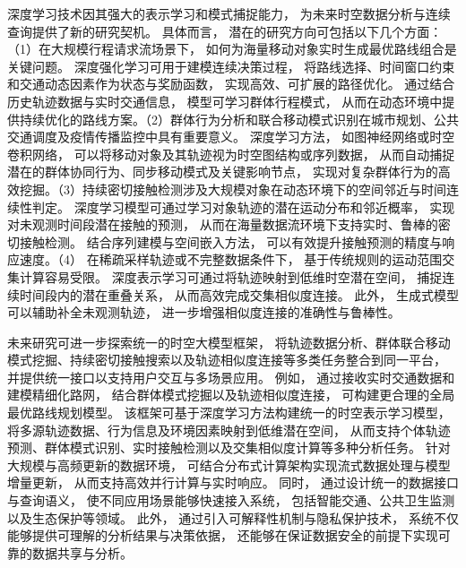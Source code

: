 深度学习技术因其强大的表示学习和模式捕捉能力， 为未来时空数据分析与连续查询提供了新的研究契机。 具体而言， 潜在的研究方向可包括以下几个方面：（1）在大规模行程请求流场景下， 如何为海量移动对象实时生成最优路线组合是关键问题。 深度强化学习可用于建模连续决策过程， 将路线选择、时间窗口约束和交通动态因素作为状态与奖励函数， 实现高效、可扩展的路径优化。 通过结合历史轨迹数据与实时交通信息， 模型可学习群体行程模式， 从而在动态环境中提供持续优化的路线方案。（2）群体行为分析和联合移动模式识别在城市规划、公共交通调度及疫情传播监控中具有重要意义。 深度学习方法， 如图神经网络或时空卷积网络， 可以将移动对象及其轨迹视为时空图结构或序列数据， 从而自动捕捉潜在的群体协同行为、同步移动模式及关键影响节点， 实现对复杂群体行为的高效挖掘。（3）持续密切接触检测涉及大规模对象在动态环境下的空间邻近与时间连续性判定。 深度学习模型可通过学习对象轨迹的潜在运动分布和邻近概率， 实现对未观测时间段潜在接触的预测， 从而在海量数据流环境下支持实时、鲁棒的密切接触检测。 结合序列建模与空间嵌入方法， 可以有效提升接触预测的精度与响应速度。（4） 在稀疏采样轨迹或不完整数据条件下， 基于传统规则的运动范围交集计算容易受限。 深度表示学习可通过将轨迹映射到低维时空潜在空间， 捕捉连续时间段内的潜在重叠关系， 从而高效完成交集相似度连接。 此外， 生成式模型可以辅助补全未观测轨迹， 进一步增强相似度连接的准确性与鲁棒性。

未来研究可进一步探索统一的时空大模型框架， 将轨迹数据分析、群体联合移动模式挖掘、持续密切接触搜索以及轨迹相似度连接等多类任务整合到同一平台， 并提供统一接口以支持用户交互与多场景应用。 例如， 通过接收实时交通数据和建模精细化路网， 结合群体模式挖掘以及轨迹相似度连接， 可构建更合理的全局最优路线规划模型。 该框架可基于深度学习方法构建统一的时空表示学习模型， 将多源轨迹数据、行为信息及环境因素映射到低维潜在空间， 从而支持个体轨迹预测、群体模式识别、实时接触检测以及交集相似度计算等多种分析任务。 针对大规模与高频更新的数据环境， 可结合分布式计算架构实现流式数据处理与模型增量更新， 从而支持高效并行计算与实时响应。 同时， 通过设计统一的数据接口与查询语义， 使不同应用场景能够快速接入系统， 包括智能交通、公共卫生监测以及生态保护等领域。 此外， 通过引入可解释性机制与隐私保护技术， 系统不仅能够提供可理解的分析结果与决策依据， 还能够在保证数据安全的前提下实现可靠的数据共享与分析。
